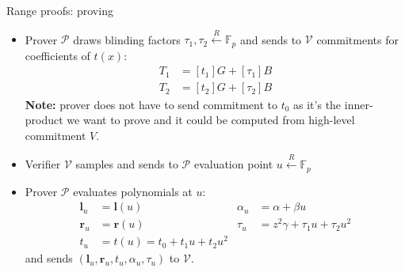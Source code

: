 \documentclass{zkdl-presentation-template}
\begin{document}
\begin{frame}{Range proofs: proving}
    \begin{itemize}
        \item Prover $\mathcal{P}$ draws blinding factors $\tau_1, \tau_2 \xleftarrow{R} \mathbb{F}_p$ and sends to $\mathcal{V}$ commitments for coefficients of $t(x)$:
            \begin{equation*}
                \begin{aligned}
                    T_1 &= [t_1]G + [\tau_1]B \\
                    T_2 &= [t_2]G + [\tau_2]B
                \end{aligned}
            \end{equation*}
            \textbf{Note:} prover does not have to send commitment to $t_0$ as it's the inner-product we want to prove and it could be computed from high-level commitment $V$.
        \item Verifier $\mathcal{V}$ samples and sends to $\mathcal{P}$ evaluation point $u \xleftarrow{R} \mathbb{F}_p$
        \item Prover $\mathcal{P}$ evaluates polynomials at $u$:
        \begin{equation*}
            \begin{aligned}
                \mathbf{l}_u & = \mathbf{l}(u) & \alpha_u &= \alpha + \beta u\\
                \mathbf{r}_u &= \mathbf{r}(u) & \tau_u &= z^2\gamma + \tau_1 u + \tau_2 u^2\\
                t_u &= t(u) = t_0 + t_1u + t_2u^2 & 
            \end{aligned}
        \end{equation*}
        and sends $(\mathbf{l}_u, \mathbf{r}_u, t_u, \alpha_u, \tau_u)$ to $\mathcal{V}$.
    \end{itemize}
\end{frame}
\end{document}
